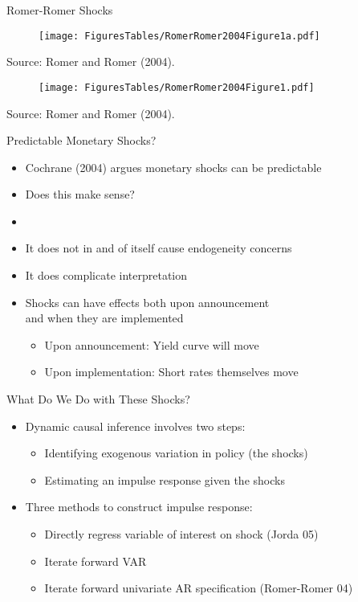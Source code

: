 \documentclass[11pt,aspectratio=169,xcolor={dvipsnames},hyperref={pdftex,pdfpagemode=UseNone,hidelinks,pdfdisplaydoctitle=true},usepdftitle=false]{beamer}
\begin{document}
\begin{frame}{Romer-Romer Shocks}
\begin{figure}
\centering
\texttt{[image: FiguresTables/RomerRomer2004Figure1a.pdf]}
\end{figure}
\vspace{-5mm}
{\scriptsize Source: Romer and Romer (2004).} 
\end{frame}


\begin{frame}
\begin{figure}
\centering
\texttt{[image: FiguresTables/RomerRomer2004Figure1.pdf]}
\end{figure}
\vspace{-5mm}
{\scriptsize Source: Romer and Romer (2004).} 
\end{frame}


\begin{frame}{Predictable Monetary Shocks?}
\begin{itemize}
\item Cochrane (2004) argues monetary shocks can be predictable
\item Does this make sense? \pause
\item[]
\item It does not in and of itself cause endogeneity concerns
\item It does complicate interpretation
\item Shocks can have effects both upon announcement \\ and when they are implemented
\begin{itemize}
\item Upon announcement: Yield curve will move
\item Upon implementation: Short rates themselves move
\end{itemize}
\end{itemize}
\end{frame}


\begin{frame}{What Do We Do with These Shocks?}
\begin{itemize}
\itemsep2em 
\item Dynamic causal inference involves two steps:
\begin{itemize}
\item Identifying exogenous variation in policy (the shocks)
\item Estimating an impulse response given the shocks
\end{itemize}
\item Three methods to construct impulse response:
\begin{itemize}
\item Directly regress variable of interest on shock (Jorda 05)
\item Iterate forward VAR
\item Iterate forward univariate AR specification (Romer-Romer 04)
\end{itemize}
\end{itemize}
\end{frame}
\end{document}
